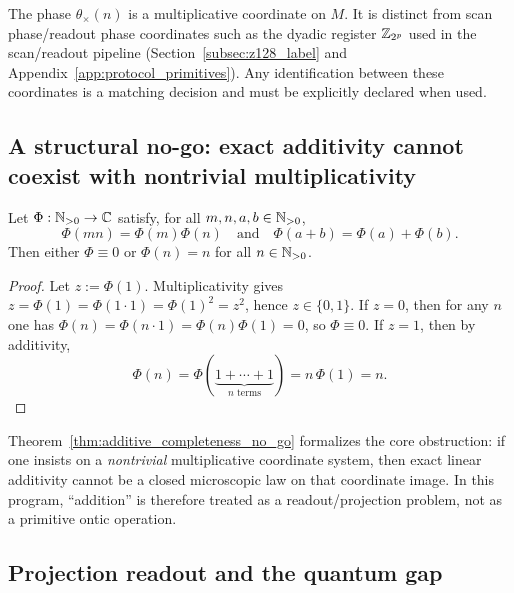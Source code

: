 \begin{remark}
\AuditTag The phase $\theta_\times(n)$ is a multiplicative coordinate on $M$.
It is distinct from scan phase/readout phase coordinates such as the dyadic register $\mathbb{Z}_{2^p}$ used in the scan/readout pipeline (Section~\ref{subsec:z128_label} and Appendix~\ref{app:protocol_primitives}).
Any identification between these coordinates is a \MatchTag matching decision and must be explicitly declared when used.
\end{remark}

\subsection{A structural no-go: exact additivity cannot coexist with nontrivial multiplicativity}
\label{subsec:additive_no_go}

\begin{theorem}
\label{thm:additive_completeness_no_go}
\MathTag Let $\Phi:\mathbb{N}_{>0}\to\mathbb{C}$ satisfy, for all $m,n,a,b\in\mathbb{N}_{>0}$,
\[
\Phi(mn)=\Phi(m)\Phi(n)
\quad\text{and}\quad
\Phi(a+b)=\Phi(a)+\Phi(b).
\]
Then either $\Phi\equiv 0$ or $\Phi(n)=n$ for all $n\in\mathbb{N}_{>0}$.
\end{theorem}
\begin{proof}
Let $z:=\Phi(1)$. Multiplicativity gives $z=\Phi(1)=\Phi(1\cdot 1)=\Phi(1)^2=z^2$, hence $z\in\{0,1\}$.
If $z=0$, then for any $n$ one has $\Phi(n)=\Phi(n\cdot 1)=\Phi(n)\Phi(1)=0$, so $\Phi\equiv 0$.
If $z=1$, then by additivity,
\[
\Phi(n)=\Phi(\underbrace{1+\cdots+1}_{n\text{ terms}})=n\,\Phi(1)=n.
\]
\end{proof}

\begin{remark}
\InterfaceTag Theorem~\ref{thm:additive_completeness_no_go} formalizes the core obstruction:
if one insists on a \emph{nontrivial} multiplicative coordinate system, then exact linear additivity cannot be a closed microscopic law on that coordinate image.
In this program, ``addition'' is therefore treated as a readout/projection problem, not as a primitive ontic operation.
\end{remark}

\subsection{Projection readout and the quantum gap}
\label{subsec:projection_readout_quantum_gap}

